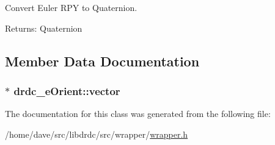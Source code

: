 Convert Euler RPY to Quaternion. 

\begin{Desc}
\item[Returns:]Quaternion \end{Desc}


\subsection{Member Data Documentation}
\hypertarget{classdrdc__eOrient_3c20a6d621dbcb6b4a52a25843f081e6}{
\subsubsection[vector]{$\ast$ {\bf drdc\_\-eOrient::vector}}}
\label{classdrdc__eOrient_3c20a6d621dbcb6b4a52a25843f081e6}




The documentation for this class was generated from the following file:\begin{CompactItemize}
\item 
/home/dave/src/libdrdc/src/wrapper/\hyperlink{wrapper_8h}{wrapper.h}\end{CompactItemize}
